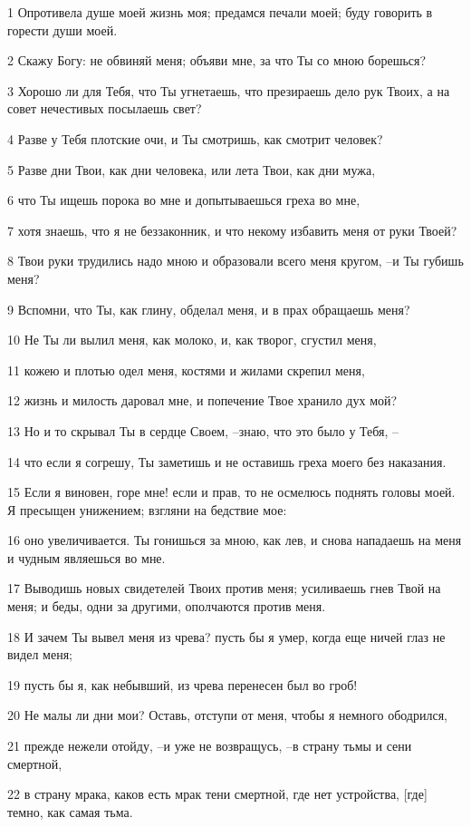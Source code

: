 \par 1 Опротивела душе моей жизнь моя; предамся печали моей; буду говорить в горести души моей.
\par 2 Скажу Богу: не обвиняй меня; объяви мне, за что Ты со мною борешься?
\par 3 Хорошо ли для Тебя, что Ты угнетаешь, что презираешь дело рук Твоих, а на совет нечестивых посылаешь свет?
\par 4 Разве у Тебя плотские очи, и Ты смотришь, как смотрит человек?
\par 5 Разве дни Твои, как дни человека, или лета Твои, как дни мужа,
\par 6 что Ты ищешь порока во мне и допытываешься греха во мне,
\par 7 хотя знаешь, что я не беззаконник, и что некому избавить меня от руки Твоей?
\par 8 Твои руки трудились надо мною и образовали всего меня кругом, --и Ты губишь меня?
\par 9 Вспомни, что Ты, как глину, обделал меня, и в прах обращаешь меня?
\par 10 Не Ты ли вылил меня, как молоко, и, как творог, сгустил меня,
\par 11 кожею и плотью одел меня, костями и жилами скрепил меня,
\par 12 жизнь и милость даровал мне, и попечение Твое хранило дух мой?
\par 13 Но и то скрывал Ты в сердце Своем, --знаю, что это было у Тебя, --
\par 14 что если я согрешу, Ты заметишь и не оставишь греха моего без наказания.
\par 15 Если я виновен, горе мне! если и прав, то не осмелюсь поднять головы моей. Я пресыщен унижением; взгляни на бедствие мое:
\par 16 оно увеличивается. Ты гонишься за мною, как лев, и снова нападаешь на меня и чудным являешься во мне.
\par 17 Выводишь новых свидетелей Твоих против меня; усиливаешь гнев Твой на меня; и беды, одни за другими, ополчаются против меня.
\par 18 И зачем Ты вывел меня из чрева? пусть бы я умер, когда еще ничей глаз не видел меня;
\par 19 пусть бы я, как небывший, из чрева перенесен был во гроб!
\par 20 Не малы ли дни мои? Оставь, отступи от меня, чтобы я немного ободрился,
\par 21 прежде нежели отойду, --и уже не возвращусь, --в страну тьмы и сени смертной,
\par 22 в страну мрака, каков есть мрак тени смертной, где нет устройства, [где] темно, как самая тьма.


